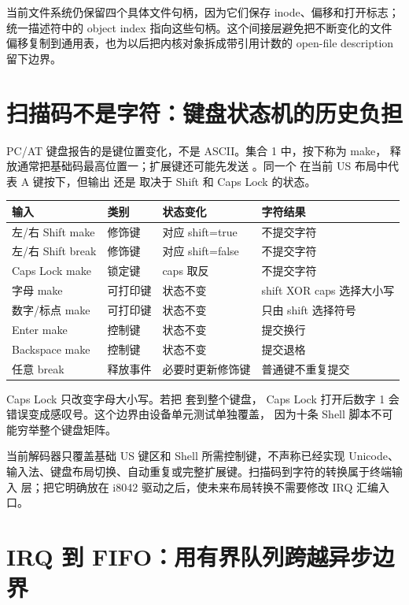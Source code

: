 当前文件系统仍保留四个具体文件句柄，因为它们保存 inode、偏移和打开标志；
统一描述符中的 object index 指向这些句柄。这个间接层避免把不断变化的文件
偏移复制到通用表，也为以后把内核对象拆成带引用计数的 open-file description
留下边界。

\section{扫描码不是字符：键盘状态机的历史负担}

PC/AT 键盘报告的是键位置变化，不是 ASCII。集合 1 中，按下称为 make，
释放通常把基础码最高位置一；扩展键还可能先发送 。同一个
 在当前 US 布局中代表 A 键按下，但输出  还是
 取决于 Shift 和 Caps Lock 的状态。

\begin{longtable}{L{0.18\textwidth}L{0.18\textwidth}L{0.22\textwidth}L{0.30\textwidth}}
\toprule
输入 & 类别 & 状态变化 & 字符结果\\
\midrule
左/右 Shift make & 修饰键 & 对应 shift=true & 不提交字符\\
左/右 Shift break & 修饰键 & 对应 shift=false & 不提交字符\\
Caps Lock make & 锁定键 & caps 取反 & 不提交字符\\
字母 make & 可打印键 & 状态不变 & shift XOR caps 选择大小写\\
数字/标点 make & 可打印键 & 状态不变 & 只由 shift 选择符号\\
Enter make & 控制键 & 状态不变 & 提交换行\\
Backspace make & 控制键 & 状态不变 & 提交退格\\
任意 break & 释放事件 & 必要时更新修饰键 & 普通键不重复提交\\
\bottomrule
\end{longtable}

Caps Lock 只改变字母大小写。若把  套到整个键盘，
Caps Lock 打开后数字 1 会错误变成感叹号。这个边界由设备单元测试单独覆盖，
因为十条 Shell 脚本不可能穷举整个键盘矩阵。

当前解码器只覆盖基础 US 键区和 Shell 所需控制键，不声称已经实现 Unicode、
输入法、键盘布局切换、自动重复或完整扩展键。扫描码到字符的转换属于终端输入
层；把它明确放在 i8042 驱动之后，使未来布局转换不需要修改 IRQ 汇编入口。

\section{IRQ 到 FIFO：用有界队列跨越异步边界}

